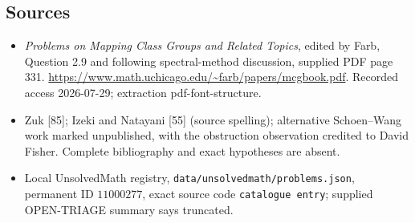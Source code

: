 \documentclass[11pt]{article}
\begin{document}
\subsection{Sources}
\begin{itemize}
\item \emph{Problems on Mapping Class Groups and Related Topics}, edited by Farb, Question 2.9 and following spectral-method discussion, supplied PDF page 331. \url{https://www.math.uchicago.edu/~farb/papers/mcgbook.pdf}. Recorded access 2026-07-29; extraction pdf-font-structure.
\item Zuk [85]; Izeki and Natayani [55] (source spelling); alternative Schoen--Wang work marked unpublished, with the obstruction observation credited to David Fisher. Complete bibliography and exact hypotheses are absent.
\item Local UnsolvedMath registry, \texttt{data/unsolvedmath/problems.json}, permanent ID \(11000277\), exact source code \texttt{catalogue entry}; supplied OPEN-TRIAGE summary says truncated.
\end{itemize}
\end{document}
